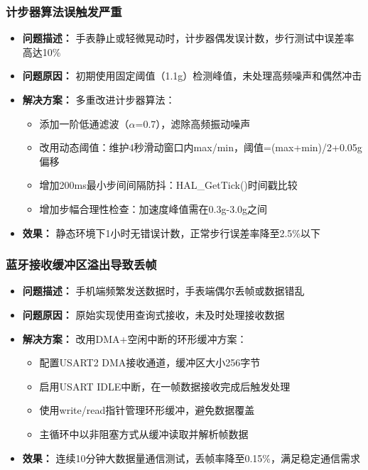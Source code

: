 \subsubsection{计步器算法误触发严重}
\begin{itemize}
    \item \textbf{问题描述：} 手表静止或轻微晃动时，计步器偶发误计数，步行测试中误差率高达10\%
    \item \textbf{问题原因：} 初期使用固定阈值（1.1g）检测峰值，未处理高频噪声和偶然冲击
    \item \textbf{解决方案：} 多重改进计步器算法：
    \begin{itemize}
        \item 添加一阶低通滤波（$\alpha$=0.7），滤除高频振动噪声
        \item 改用动态阈值：维护4秒滑动窗口内max/min，阈值=(max+min)/2+0.05g偏移
        \item 增加200ms最小步间间隔防抖：HAL\_GetTick()时间戳比较
        \item 增加步幅合理性检查：加速度峰值需在0.3g-3.0g之间
    \end{itemize}
    \item \textbf{效果：} 静态环境下1小时无错误计数，正常步行误差率降至2.5\%以下
\end{itemize}

\subsubsection{蓝牙接收缓冲区溢出导致丢帧}
\begin{itemize}
    \item \textbf{问题描述：} 手机端频繁发送数据时，手表端偶尔丢帧或数据错乱
    \item \textbf{问题原因：} 原始实现使用查询式接收，未及时处理接收数据
    \item \textbf{解决方案：} 改用DMA+空闲中断的环形缓冲方案：
    \begin{itemize}
        \item 配置USART2 DMA接收通道，缓冲区大小256字节
        \item 启用USART IDLE中断，在一帧数据接收完成后触发处理
        \item 使用write/read指针管理环形缓冲，避免数据覆盖
        \item 主循环中以非阻塞方式从缓冲读取并解析帧数据
    \end{itemize}
    \item \textbf{效果：} 连续10分钟大数据量通信测试，丢帧率降至0.15\%，满足稳定通信需求
\end{itemize}


